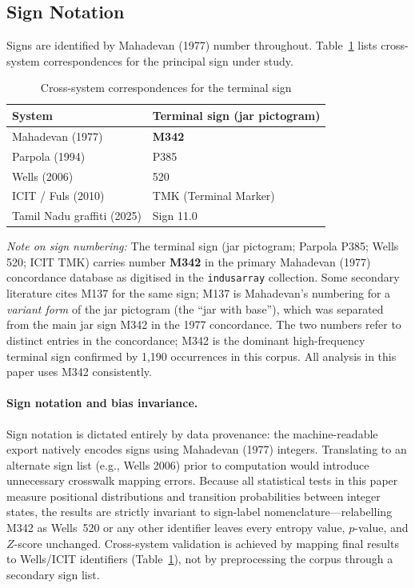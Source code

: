 \documentclass[12pt,letterpaper]{article}
\begin{document}
\subsection{Sign Notation}

Signs are identified by Mahadevan (1977) number throughout.
Table~\ref{tab:crosssys} lists cross-system correspondences for the
principal sign under study.

\begin{table}[htbp]
\centering
\caption{Cross-system correspondences for the terminal sign}
\label{tab:crosssys}
\begin{tabular}{ll}
\toprule
System & Terminal sign (jar pictogram) \\
\midrule
Mahadevan (1977)           & \textbf{M342} \\
Parpola (1994)             & P385 \\
Wells (2006)               & 520 \\
ICIT / Fuls (2010)         & TMK (Terminal Marker) \\
Tamil Nadu graffiti (2025) & Sign 11.0 \\
\bottomrule
\end{tabular}
\end{table}

\noindent\textit{Note on sign numbering:}
The terminal sign (jar pictogram; Parpola P385; Wells 520; ICIT TMK)
carries number \textbf{M342} in the primary Mahadevan (1977)
concordance database as digitised in the \texttt{indusarray} collection.
Some secondary literature cites M137 for the same sign;
M137 is Mahadevan's numbering for a \emph{variant form} of the jar
pictogram (the ``jar with base''), which was separated from the main
jar sign M342 in the 1977 concordance.
The two numbers refer to distinct entries in the concordance;
M342 is the dominant high-frequency terminal sign confirmed by
1,190 occurrences in this corpus.
All analysis in this paper uses M342 consistently.

\paragraph{Sign notation and bias invariance.}
Sign notation is dictated entirely by data provenance: the
machine-readable export natively encodes signs using Mahadevan (1977)
integers.
Translating to an alternate sign list (e.g., Wells 2006) prior to
computation would introduce unnecessary crosswalk mapping errors.
Because all statistical tests in this paper measure positional
distributions and transition probabilities between integer states,
the results are strictly invariant to sign-label nomenclature---relabelling
M342 as Wells~520 or any other identifier leaves every entropy value,
$p$-value, and $Z$-score unchanged.
Cross-system validation is achieved by mapping final results to
Wells/ICIT identifiers (Table~\ref{tab:crosssys}), not by
preprocessing the corpus through a secondary sign list.
\end{document}
